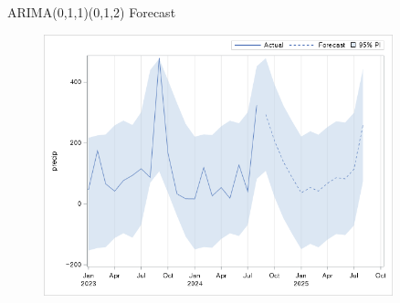 \documentclass{beamer}
\begin{document}
\begin{frame}{ARIMA(0,1,1)(0,1,2) Forecast}
    \begin{figure}
        \centering
        \includegraphics[width=0.9\textwidth]{modelresult.png}
    \end{figure}
\end{frame}



\end{document}
